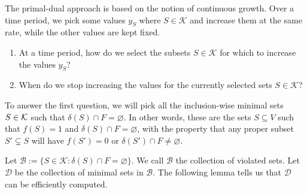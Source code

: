 The primal-dual approach is based on the notion of continuous growth. 
Over a time period, we pick some values $y_S$ where $S \in \mathcal{K}$
and increase them at the same rate, while the other values are kept fixed. 
\begin{enumerate}[(1)]
    \item At a time period, how do we select the subsets $S \in \mathcal{K}$ 
    for which to increase the values $y_S$?
    \item When do we stop increasing the values for the currently 
    selected sets $S \in \mathcal{K}$?
\end{enumerate}
To answer the first question, we will pick all the inclusion-wise minimal sets 
$S \in {\cal K}$ such that $\delta(S) \cap F = \varnothing$. In other words, 
these are the sets $S \subseteq V$ such that $f(S) = 1$ and $\delta(S) \cap F 
= \varnothing$, with the property that any proper subset $S' \subsetneq S$ will have 
$f(S') = 0$ or $\delta(S') \cap F \neq \varnothing$. 

Let $\mathcal{B} := \{S \in \mathcal{K} : \delta(S) \cap F = \varnothing\}$. 
We call $\mathcal{B}$ the collection of violated sets. Let
$\mathcal{D}$ be the collection of minimal sets in $\mathcal{B}$. The following 
lemma tells us that $\mathcal{D}$ can be efficiently computed.

